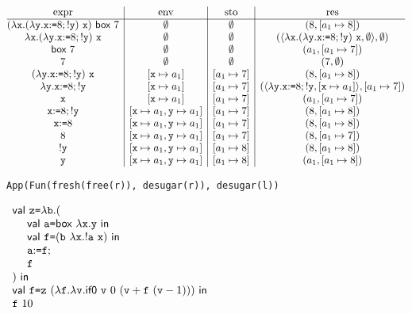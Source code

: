 $
\begin{array}{@{}c|c|c|c@{}}
  \text{expr} & \text{env} & \text{sto} & \text{res} \\\hline
  \eapp{(\efun{\cx}{\eapp{(\efun{\cy}{\eseq{\eset{\cx}{8}}{\ederef{\cy}}})}{\cx}})}{\eref{7}}
  & \emptyset & \emptyset & (8,[a_1\mapsto8]) \\
  \efun{\cx}{\eapp{(\efun{\cy}{\eseq{\eset{\cx}{8}}{\ederef{\cy}}})}{\cx}}
  & \emptyset & \emptyset &
  (\clov{\cx}{\eapp{(\efun{\cy}{\eseq{\eset{\cx}{8}}{\ederef{\cy}}})}{\cx}}{\emptyset},\emptyset) \\
  \eref{7} & \emptyset & \emptyset & (a_1,[a_1\mapsto7]) \\
  7 & \emptyset & \emptyset & (7,\emptyset) \\
  \eapp{(\efun{\cy}{\eseq{\eset{\cx}{8}}{\ederef{\cy}}})}{\cx} &
  [\cx\mapsto a_1] & [a_1\mapsto7] & (8,[a_1\mapsto8]) \\
  \efun{\cy}{\eseq{\eset{\cx}{8}}{\ederef{\cy}}} &
  [\cx\mapsto a_1] & [a_1\mapsto7] &
  (\clov{\cy}{\eseq{\eset{\cx}{8}}{\ederef{\cy}}}{[\cx\mapsto a_1]},[a_1\mapsto7]) \\
  \cx & [\cx\mapsto a_1] & [a_1\mapsto7] & (a_1,[a_1\mapsto7]) \\
  \eseq{\eset{\cx}{8}}{\ederef{\cy}} & [\cx\mapsto a_1,\cy\mapsto a_1]
  & [a_1\mapsto7] & (8,[a_1\mapsto8]) \\
  \eset{\cx}{8} & [\cx\mapsto a_1,\cy\mapsto a_1] & [a_1\mapsto7]
  & (8,[a_1\mapsto8]) \\
  8 & [\cx\mapsto a_1,\cy\mapsto a_1] & [a_1\mapsto7] & (8,[a_1\mapsto7]) \\
  \ederef{\cy} & [\cx\mapsto a_1,\cy\mapsto a_1] & [a_1\mapsto8]
  & (8,[a_1\mapsto8]) \\
  \cy & [\cx\mapsto a_1,\cy\mapsto a_1] & [a_1\mapsto8] & (a_1,[a_1\mapsto8]) \\
\end{array}
$
\\

\textbf{}
\vspace{-1em}
\begin{verbatim}
App(Fun(fresh(free(r)), desugar(r)), desugar(l))
\end{verbatim}

\textbf{}

$\begin{array}{l}
  \ebind{\cz}{\efun{\cb}{(\\
  \ \ \ \ \ebind{\ca}{\eref{\efun{\cx}{\cy}}}{\\
  \ \ \ \ \ebind{\cf}{(\eapp{\cb}{\efun{\cx}{\eapp{\ederef{\ca}}{\cx}}})}{\\
  \ \ \ \ \eseq{\eset{\ca}{\cf}}{\\
  \ \ \ \ \cf\\
  }}})}}{\\
  \ebind{\cf}{\eapp{\cz}{(\efun{\cf}{\efun{\cv}{\sumbodyfv}})}}{\\
  \eapp{\cf}{10}}}
\end{array}$
\\

